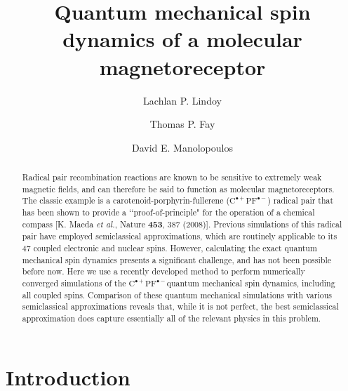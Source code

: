 \documentclass[%
aip,
jcp,%
amsmath,amssymb,
reprint%
]{revtex4-1}
\newcommand{\CPFrp}{$\text{C}^{\bullet +}\text{PF}^{\bullet-}$}
\begin{document}
	
\title{Quantum mechanical spin dynamics of a molecular magnetoreceptor}
\author{Lachlan P. Lindoy}
\author{Thomas P. Fay}
\author{David E. Manolopoulos}

\begin{abstract}
Radical pair recombination reactions are known to be sensitive to extremely weak magnetic fields, and can therefore be said to function as molecular magnetoreceptors. The classic example is a carotenoid-porphyrin-fullerene (\CPFrp) radical pair that has been shown to provide a \lq\lq proof-of-principle" for the operation of a chemical compass [K. Maeda {\em et al.}, Nature {\bf 453}, 387 (2008)]. Previous simulations of this radical pair have employed semiclassical approximations, which are routinely applicable to its 47 coupled electronic and nuclear spins. However, calculating the exact quantum mechanical spin dynamics presents a significant challenge, and has not been possible before now. Here we use a recently developed method to perform numerically converged simulations of the \CPFrp quantum mechanical spin dynamics, including all coupled spins. Comparison of these quantum mechanical simulations with various semiclassical approximations reveals that, while it is not perfect, the best semiclassical approximation does capture essentially all of the relevant physics in this problem. 
\end{abstract}

\maketitle
	
\section{Introduction}
\end{document}
